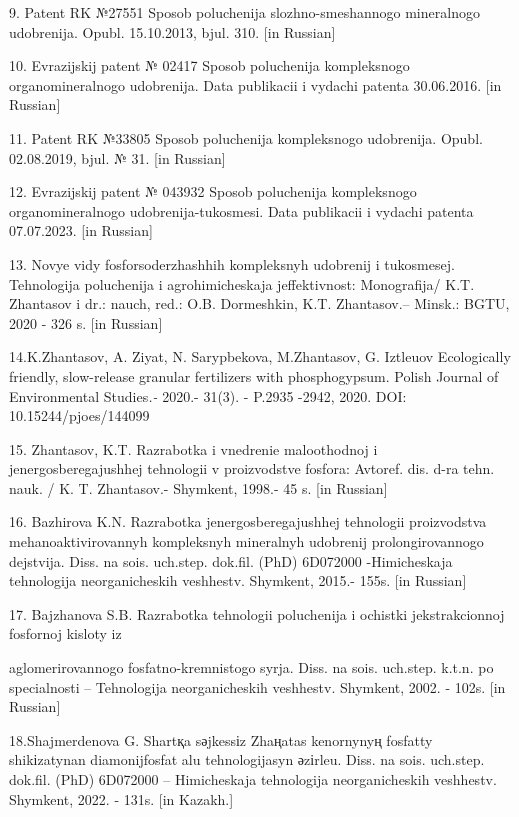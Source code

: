 \begin{noparindent}
9. Patent RK №27551 Sposob poluchenija slozhno-smeshannogo
mineral\textquotesingle nogo udobrenija. Opubl. 15.10.2013, bjul. 310.
{[}in Russian{]}

10. Evrazijskij patent № 02417 Sposob poluchenija kompleksnogo
organomineral\textquotesingle nogo udobrenija. Data publikacii i vydachi
patenta 30.06.2016. {[}in Russian{]}

11. Patent RK №33805 Sposob poluchenija kompleksnogo udobrenija. Opubl.
02.08.2019, bjul. № 31. {[}in Russian{]}

12. Evrazijskij patent № 043932 Sposob poluchenija kompleksnogo
organomineral\textquotesingle nogo udobrenija-tukosmesi. Data publikacii
i vydachi patenta 07.07.2023. {[}in Russian{]}

13. Novye vidy fosforsoderzhashhih kompleksnyh udobrenij i tukosmesej.
Tehnologija poluchenija i agrohimicheskaja
jeffektivnost\textquotesingle: Monografija/ K.T. Zhantasov i dr.: nauch,
red.: O.B. Dormeshkin, K.T. Zhantasov.-- Minsk.: BGTU, 2020 - 326 s.
{[}in Russian{]}

14.K.Zhantasov, A. Ziyat, N. Sarypbekova, M.Zhantasov, G. Iztleuov
Ecologically friendly, slow-release granular fertilizers with
phosphogypsum. Polish Journal of Environmental Studies\emph{.-} 2020.-
31(3). - P.2935 -2942, 2020. DOI: 10.15244/pjoes/144099

15. Zhantasov, K.T. Razrabotka i vnedrenie maloothodnoj i
jenergosberegajushhej tehnologii v proizvodstve fosfora: Avtoref. dis.
d-ra tehn. nauk. / K. T. Zhantasov.- Shymkent, 1998.- 45 s. {[}in
Russian{]}

16. Bazhirova K.N. Razrabotka jenergosberegajushhej tehnologii
proizvodstva mehanoaktivirovannyh kompleksnyh
mineral\textquotesingle nyh udobrenij prolongirovannogo dejstvija. Diss.
na sois. uch.step. dok.fil. (PhD) 6D072000 -Himicheskaja tehnologija
neorganicheskih veshhestv. Shymkent, 2015.- 155s. {[}in Russian{]}

17. Bajzhanova S.B. Razrabotka tehnologii poluchenija i ochistki
jekstrakcionnoj fosfornoj kisloty iz

aglomerirovannogo
fosfatno-kremnistogo syr\textquotesingle ja. Diss. na sois. uch.step.
k.t.n. po special\textquotesingle nosti -- Tehnologija neorganicheskih
veshhestv. Shymkent, 2002. - 102s. {[}in Russian{]}

18.Shajmerdenova G. Shartқa sәjkessіz Zhaңatas kenornynyң fosfatty
shikіzatynan diamonijfosfat alu tehnologijasyn әzіrleu. Diss. na sois.
uch.step. dok.fil. (PhD) 6D072000 -- Himicheskaja tehnologija
neorganicheskih veshhestv. Shymkent, 2022. - 131s. {[}in Kazakh.{]}


\end{noparindent}
